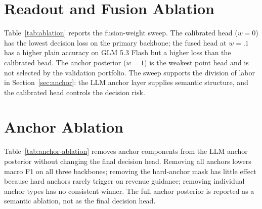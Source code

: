 \documentclass[11pt]{article}
\begin{document}
\section{Readout and Fusion Ablation}
\label{app:readout}
Table~\ref{tab:ablation} reports the fusion-weight sweep. The calibrated head ($w=0$) has the lowest decision loss on the primary backbone; the fused head at $w=.1$ has a higher plain accuracy on GLM 5.3 Flash but a higher loss than the calibrated head. The anchor posterior ($w=1$) is the weakest point head and is not selected by the validation portfolio. The sweep supports the division of labor in Section~\ref{sec:anchor}: the LLM anchor layer supplies semantic structure, and the calibrated head controls the decision risk.



\section{Anchor Ablation}
\label{app:anchor_ablation}
Table~\ref{tab:anchor-ablation} removes anchor components from the LLM anchor posterior without changing the final decision head. Removing all anchors lowers macro F1 on all three backbones; removing the hard-anchor mask has little effect because hard anchors rarely trigger on revenue guidance; removing individual anchor types has no consistent winner. The full anchor posterior is reported as a semantic ablation, not as the final decision head.

\begin{table}[t]
\centering
\scriptsize
\setlength{\tabcolsep}{2.5pt}
\caption{Anchor-component ablation on the LLM anchor posterior. ``No anchors'' uses only the prior and bucket scores; ``no hard'' removes the hard-anchor mask; the remaining rows remove one anchor type.}
\label{tab:anchor-ablation}
\end{table}
\end{document}
